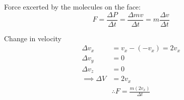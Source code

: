 \documentclass[fleqn,10pt]{SelfArx} %
\begin{document}
%
%
%
%
%
%
%
%
%
%
%
%

Force excerted by the molecules  on the face:
\begin{equation}
   F = \frac{\Delta P}{\Delta t} = \frac{\Delta mv}{\Delta t} = m\frac{\Delta v}{\Delta t}
    \label{eq:force exerted}
\end{equation}

Change in velocity 
\begin{align}
   \Delta v_x &= v_x - (-v_x) = 2v_x \\
   \Delta v_y &= 0 \\
   \Delta v_z &= 0 \\
   \implies \Delta V &= 2v_x
   \label{eq:velocity of particle}
\end{align}
\begin{align}
    \therefore F = \frac{m (2v_x)}{\Delta t}     \label{eq: force_equation}
\end{align}
\end{document}
